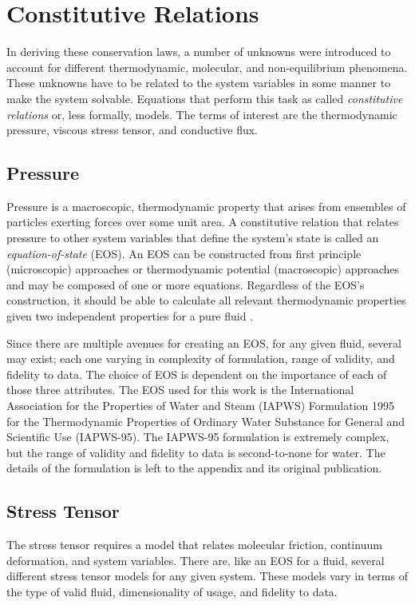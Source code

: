\documentclass[12pt]{../UWMadThesis}
\begin{document}
\section{Constitutive Relations}\label{Section:ConstitutiveRelations}
In deriving these conservation laws, a number of unknowns were introduced to account for different thermodynamic, molecular, and non-equilibrium phenomena.
These unknowns have to be related to the system variables in some manner to make the system solvable.
Equations that perform this task as called \textit{constitutive relations} or, less formally, models.
The terms of interest are the thermodynamic pressure, viscous stress tensor, and conductive flux.

\subsection{Pressure}
Pressure is a macroscopic, thermodynamic property that arises from ensembles of particles exerting forces over some unit area.
A constitutive relation that relates pressure to other system variables that define the system's state is called an \textit{equation-of-state} (EOS).
An EOS can be constructed from first principle (microscopic) approaches or thermodynamic potential (macroscopic) approaches and may be composed of one or more equations.
Regardless of the EOS's construction, it should be able to calculate all relevant thermodynamic properties given two independent properties for a pure fluid \NeedReference{}.

Since there are multiple avenues for creating an EOS, for any given fluid, several may exist; each one varying in complexity of formulation, range of validity, and fidelity to data.
The choice of EOS is dependent on the importance of each of those three attributes.
The EOS used for this work is the International Association for the Properties of Water and Steam (IAPWS) Formulation 1995 for the Thermodynamic Properties of Ordinary Water Substance for General and Scientific Use (IAPWS-95).
The IAPWS-95 formulation is extremely complex, but the range of validity and fidelity to data is second-to-none for water.
The details of the formulation is left to the appendix and its original publication.



\subsection{Stress Tensor}
The stress tensor requires a model that relates molecular friction, continuum deformation, and system variables.
There are, like an EOS for a fluid, several different stress tensor models for any given system.
These models vary in terms of the type of valid fluid, dimensionality of usage, and fidelity to data.
\end{document}
